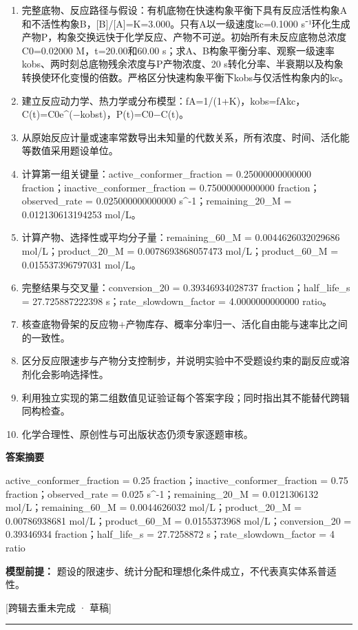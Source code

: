 \documentclass[UTF8,11pt,a4paper]{ctexart}
\begin{document}
\begin{enumerate}
\item 完整底物、反应路径与假设：有机底物在快速构象平衡下具有反应活性构象A和不活性构象B，[B]/[A]=K=3.000。只有A以一级速度kc=0.1000 s⁻¹环化生成产物P，构象交换远快于化学反应、产物不可逆。初始所有未反应底物总浓度C0=0.02000 M，t=20.00和60.00 s；求A、B构象平衡分率、观察一级速率kobs、两时刻总底物残余浓度与P产物浓度、20 s转化分率、半衰期以及构象转换使环化变慢的倍数。严格区分快速构象平衡下kobs与仅活性构象内的kc。
\item 建立反应动力学、热力学或分布模型：fA=1/(1+K)，kobs=fAkc，C(t)=C0e\textasciicircum{}(−kobst)，P(t)=C0−C(t)。
\item 从原始反应计量或速率常数导出未知量的代数关系，所有浓度、时间、活化能等数值采用题设单位。
\item 计算第一组关键量：active\_conformer\_fraction = 0.25000000000000 fraction；inactive\_conformer\_fraction = 0.75000000000000 fraction；observed\_rate = 0.025000000000000 s\textasciicircum{}-1；remaining\_20\_M = 0.012130613194253 mol/L。
\item 计算产物、选择性或平均分子量：remaining\_60\_M = 0.0044626032029686 mol/L；product\_20\_M = 0.0078693868057473 mol/L；product\_60\_M = 0.015537396797031 mol/L。
\item 完整结果与交叉量：conversion\_20 = 0.39346934028737 fraction；half\_life\_s = 27.725887222398 s；rate\_slowdown\_factor = 4.0000000000000 ratio。
\item 核查底物骨架的反应物+产物库存、概率分率归一、活化自由能与速率比之间的一致性。
\item 区分反应限速步与产物分支控制步，并说明实验中不受题设约束的副反应或溶剂化会影响选择性。
\item 利用独立实现的第二组数值见证验证每个答案字段；同时指出其不能替代跨辑同构检查。
\item 化学合理性、原创性与可出版状态仍须专家逐题审核。
\end{enumerate}
\noindent\textbf{答案摘要}\par
active\_conformer\_fraction = 0.25 fraction；inactive\_conformer\_fraction = 0.75 fraction；observed\_rate = 0.025 s\textasciicircum{}-1；remaining\_20\_M = 0.0121306132 mol/L；remaining\_60\_M = 0.0044626032 mol/L；product\_20\_M = 0.00786938681 mol/L；product\_60\_M = 0.0155373968 mol/L；conversion\_20 = 0.39346934 fraction；half\_life\_s = 27.7258872 s；rate\_slowdown\_factor = 4 ratio\par
\noindent\textbf{模型前提：}
题设的限速步、统计分配和理想化条件成立，不代表真实体系普适性。\par
\noindent\textcolor{red!65!black}{[跨辑去重未完成 · 草稿]} \par
\medskip\hrule\medskip
{}
\end{document}
